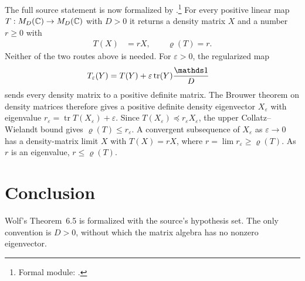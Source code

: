\documentclass{article}
\begin{document}
The full source statement is now formalized by
.\footnote{Formal module:
    .}
For every positive linear map $T:M_{D}(\mathbb{C})\to M_{D}(\mathbb{C})$ with $D>0$ it returns a
density matrix $X$ and a number $r\geq0$ with
\begin{align}
    T(X)
        &=rX,
    \qquad
    \varrho(T)=r.
    \label{eq:wolf_ch6_spectral_radius_eigenvalue_resolution}
\end{align}
Neither of the two routes above is needed. For $\varepsilon>0$, the
regularized map
\begin{align}
    T_\varepsilon(Y)
        &=T(Y)+\varepsilon\operatorname{tr}(Y)\frac{\one}{D}
    \label{eq:wolf_ch6_spectral_radius_eigenvalue_regularization}
\end{align}
sends every density matrix to a positive definite matrix. The Brouwer theorem
on density matrices therefore gives a positive definite density eigenvector
$X_\varepsilon$ with eigenvalue $r_\varepsilon=\operatorname{tr}T(X_\varepsilon)+\varepsilon$.
Since $T(X_\varepsilon)\preceq r_\varepsilon X_\varepsilon$, the upper
Collatz--Wielandt bound gives $\varrho(T)\leq r_\varepsilon$. A convergent
subsequence of $X_\varepsilon$ as $\varepsilon\to0$ has a density-matrix limit
$X$ with $T(X)=rX$, where $r=\lim r_\varepsilon\geq\varrho(T)$. As $r$ is an
eigenvalue, $r\leq\varrho(T)$.

\section{Conclusion}

Wolf's Theorem~6.5 \cite{Wolf2012Quantum} is formalized with the source's
hypothesis set. The only convention is $D>0$, without which the matrix
algebra has no nonzero eigenvector.



\end{document}
